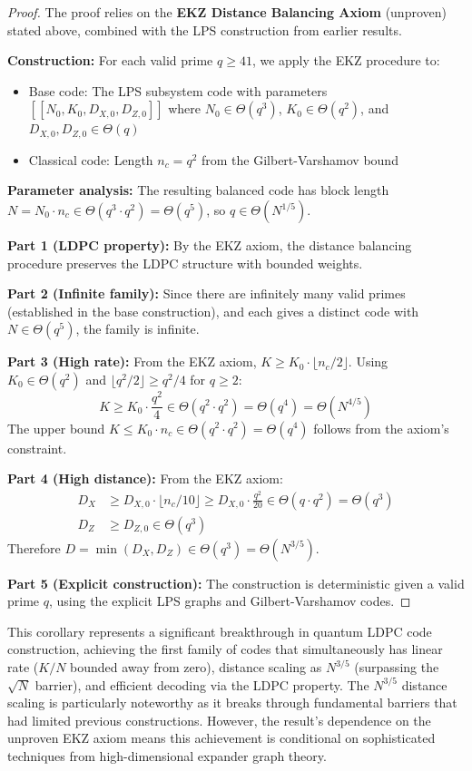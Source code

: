 \documentclass[11pt]{article}
\theoremstyle{plain}
\theoremstyle{definition}
\theoremstyle{remark}
\begin{document}
\begin{proof}
The proof relies on the \textbf{EKZ Distance Balancing Axiom} (unproven) stated above, combined with the LPS construction from earlier results.

\textbf{Construction:} For each valid prime $q \geq 41$, we apply the EKZ procedure to:
\begin{itemize}
\item Base code: The LPS subsystem code with parameters $[[N_0, K_0, D_{X,0}, D_{Z,0}]]$ where $N_0 \in \Theta(q^3)$, $K_0 \in \Theta(q^2)$, and $D_{X,0}, D_{Z,0} \in \Theta(q)$
\item Classical code: Length $n_c = q^2$ from the Gilbert-Varshamov bound
\end{itemize}

\textbf{Parameter analysis:} The resulting balanced code has block length $N = N_0 \cdot n_c \in \Theta(q^3 \cdot q^2) = \Theta(q^5)$, so $q \in \Theta(N^{1/5})$.

\textbf{Part 1 (LDPC property):} By the EKZ axiom, the distance balancing procedure preserves the LDPC structure with bounded weights.

\textbf{Part 2 (Infinite family):} Since there are infinitely many valid primes (established in the base construction), and each gives a distinct code with $N \in \Theta(q^5)$, the family is infinite.

\textbf{Part 3 (High rate):} From the EKZ axiom, $K \geq K_0 \cdot \lfloor n_c/2 \rfloor$. Using $K_0 \in \Theta(q^2)$ and $\lfloor q^2/2 \rfloor \geq q^2/4$ for $q \geq 2$:
\[
K \geq K_0 \cdot \frac{q^2}{4} \in \Theta(q^2 \cdot q^2) = \Theta(q^4) = \Theta(N^{4/5})
\]
The upper bound $K \leq K_0 \cdot n_c \in \Theta(q^2 \cdot q^2) = \Theta(q^4)$ follows from the axiom's constraint.

\textbf{Part 4 (High distance):} From the EKZ axiom:
\begin{align}
D_X &\geq D_{X,0} \cdot \lfloor n_c/10 \rfloor \geq D_{X,0} \cdot \frac{q^2}{20} \in \Theta(q \cdot q^2) = \Theta(q^3) \\
D_Z &\geq D_{Z,0} \in \Theta(q^3)
\end{align}
Therefore $D = \min(D_X, D_Z) \in \Theta(q^3) = \Theta(N^{3/5})$.

\textbf{Part 5 (Explicit construction):} The construction is deterministic given a valid prime $q$, using the explicit LPS graphs and Gilbert-Varshamov codes.
\end{proof}

This corollary represents a significant breakthrough in quantum LDPC code construction, achieving the first family of codes that simultaneously has linear rate ($K/N$ bounded away from zero), distance scaling as $N^{3/5}$ (surpassing the $\sqrt{N}$ barrier), and efficient decoding via the LDPC property. The $N^{3/5}$ distance scaling is particularly noteworthy as it breaks through fundamental barriers that had limited previous constructions. However, the result's dependence on the unproven EKZ axiom means this achievement is conditional on sophisticated techniques from high-dimensional expander graph theory.
\end{document}
